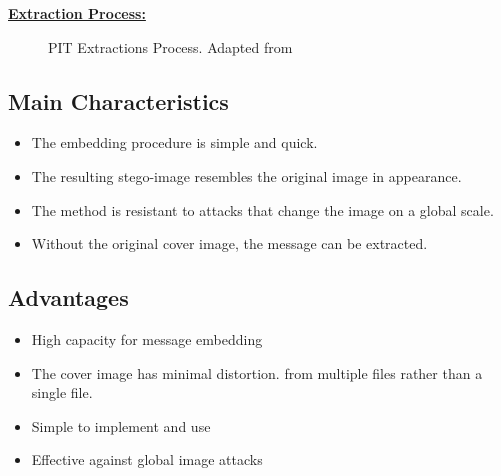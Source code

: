 \underline{\color{red}\textbf{Extraction Process:}}
\begin{figure}[ht!]
\centering
{}
\caption{PIT Extractions Process. Adapted from \cite{Gutub2010PixelIT}}
\end{figure}


\subsection{Main Characteristics}
\begin{itemize}
\item The embedding procedure is simple and quick. 
\item The resulting stego-image resembles the original image in appearance.
\item The method is resistant to attacks that change the image on a global scale.
\item Without the original cover image, the message can be extracted.
\end{itemize}

\subsection{Advantages}
\begin{itemize}
\item High capacity for message embedding
\item The cover image has minimal distortion. from multiple files rather than a single file.
\item Simple to implement and use
\item Effective against global image attacks
\end{itemize}

